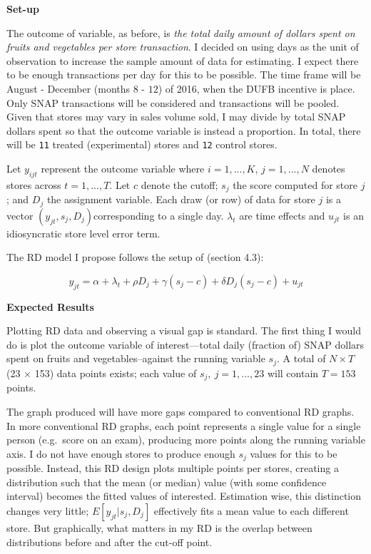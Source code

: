 \documentclass[12pt,letterpaperpaper,]{book}
\begin{document}
\textbf{Set-up}

The outcome of variable, as before, is \emph{the total daily amount of
dollars spent on fruits and vegetables per store transaction}. I decided
on using days as the unit of observation to increase the sample amount
of data for estimating. I expect there to be enough transactions per day
for this to be possible. The time frame will be August - December
(months \(8\) - \(12\)) of 2016, when the DUFB incentive is place. Only
SNAP transactions will be considered and transactions will be pooled.
Given that stores may vary in sales volume sold, I may divide by total
SNAP dollars spent so that the outcome variable is instead a proportion.
In total, there will be \texttt{11} treated (experimental) stores and
\texttt{12} control stores.

Let \(y_{ijt}\) represent the outcome variable where \(i=1,...,K\),
\(j=1,...,N\) denotes stores across \(t=1,...,T\). Let \(c\) denote the
cutoff; \(s_{j}\) the score computed for store \(j\); and \(D_{j}\) the
assignment variable. Each draw (or row) of data for store \(j\) is a
vector \((y_{jt}, s_{j}, D_{j})\)corresponding to a single day.
\(\lambda_t\) are time effects and \(u_{jt}\) is an idiosyncratic store
level error term.

The RD model I propose follows the setup of \citet{lee_regression_2010}
(section 4.3):

\[y_{jt} = \alpha + \lambda_t + \rho D_{j} + \gamma (s_{j} - c) + \delta D_{j}(s_{j} - c) + u_{jt}\]

\textbf{Expected Results}

Plotting RD data and observing a visual gap is standard. The first thing
I would do is plot the outcome variable of interest---total daily
(fraction of) SNAP dollars spent on fruits and vegetables--against the
running variable \(s_j\). A total of \(N \times T\) (23 \(\times\) 153)
data points exists; each value of \(s_j,~j=1,...,23\) will contain
\(T=153\) points.

The graph produced will have more gaps compared to conventional RD
graphs. In more conventional RD graphs, each point represents a single
value for a single person (e.g.~score on an exam), producing more points
along the running variable axis. I do not have enough stores to produce
enough \(s_j\) values for this to be possible. Instead, this RD design
plots multiple points per stores, creating a distribution such that the
mean (or median) value (with some confidence interval) becomes the
fitted values of interested. Estimation wise, this distinction changes
very little; \(E[y_{jt}|s_{j}, D_{j}]\) effectively fits a mean value to
each different store. But graphically, what matters in my RD is the
overlap between distributions before and after the cut-off point.



\backmatter
\printindex
\end{document}
